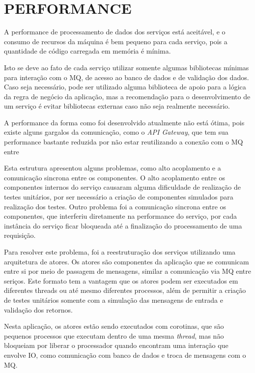 \section{PERFORMANCE}

A performance de processamento de dados dos serviços está aceitável, e
o consumo de recursos da máquina é bem pequeno para cada serviço, pois
a quantidade de código carregada em memória é mínima.

Isto se deve ao fato de cada serviço utilizar somente algumas
bibliotecas mínimas para interação com o \ac{MQ}, de acesso ao banco de
dados e de validação dos dados. Caso seja necessário, pode ser utilizado
alguma biblioteca de apoio para a lógica da regra de negócio da
aplicação, mas a recomendação para o desenvolvimento de um serviço
é evitar bibliotecas externas caso não seja realmente necessário.

A performance da forma como foi desenvolvido atualmente não está ótima,
pois existe alguns gargalos da comunicação, como o \emph{API Gateway}, que
tem sua performance bastante reduzida por não estar reutilizando a conexão
com o \ac{MQ} entre

Esta estrutura apresentou alguns problemas, como alto acoplamento e a
comunicação sincrona entre os componentes. O alto acoplamento entre
os componentes internos do serviço causaram alguma dificuldade de
realização de testes unitários, por ser necessário a criação de
componentes simulados para realização dos testes. Outro problema foi a
comunicação sincrona entre os componentes, que interferiu diretamente
na performance do serviço, por cada instância do serviço ficar bloqueada
até a finalização do processamento de uma requisição.

Para resolver este problema, foi a reestruturação dos serviços utilizando
uma arquitetura de atores. Os atores são componentes da aplicação que se
comunicam entre si por meio de passagem de mensagens, similar a comunicação
via \ac{MQ} entre seriços. Este formato tem a vantagem que os atores podem
ser executados em diferentes threads ou até mesmo diferentes processos,
além de permitir a criação de testes unitários somente com a simulação das
mensagens de entrada e validação dos retornos.

Nesta aplicação, os atores estão sendo executados com corotinas, que são
pequenos processos que executam dentro de uma mesma \emph{thread}, mas não
bloqueiam por liberar o processador quando encontram uma interação que envolve
\ac{IO}, como comunicação com banco de dados e troca de mensagens com o
\ac{MQ}.

